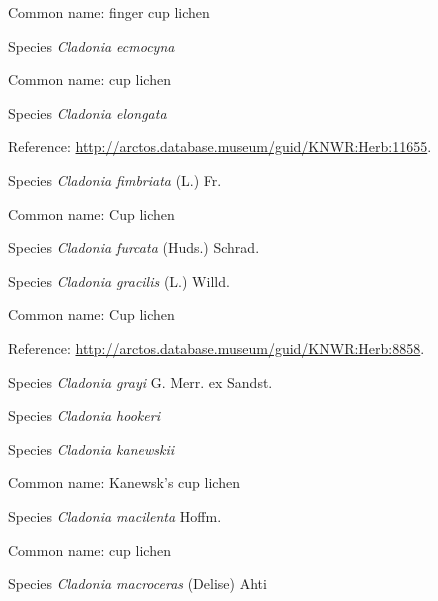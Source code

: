 \documentclass[9pt, article]{memoir}
\begin{document}
\begin{multicols}{2}
Common name: finger cup lichen

\vspace{6pt}\noindent\hspace{36pt}Species \textit{Cladonia ecmocyna}


Common name: cup lichen

\vspace{6pt}\noindent\hspace{36pt}Species \textit{Cladonia elongata}


Reference: 
\url{http://arctos.database.museum/guid/KNWR:Herb:11655}.

\vspace{6pt}\noindent\hspace{36pt}Species \textit{Cladonia fimbriata} (L.) Fr.


Common name: Cup lichen

\vspace{6pt}\noindent\hspace{36pt}Species \textit{Cladonia furcata} (Huds.) Schrad.


\vspace{6pt}\noindent\hspace{36pt}Species \textit{Cladonia gracilis} (L.) Willd.


Common name: Cup lichen

Reference: 
\url{http://arctos.database.museum/guid/KNWR:Herb:8858}.

\vspace{6pt}\noindent\hspace{36pt}Species \textit{Cladonia grayi} G. Merr. ex Sandst.


\vspace{6pt}\noindent\hspace{36pt}Species \textit{Cladonia hookeri}


\vspace{6pt}\noindent\hspace{36pt}Species \textit{Cladonia kanewskii}


Common name: Kanewsk's cup lichen

\vspace{6pt}\noindent\hspace{36pt}Species \textit{Cladonia macilenta} Hoffm.


Common name: cup lichen

\vspace{6pt}\noindent\hspace{36pt}Species \textit{Cladonia macroceras} (Delise) Ahti



\end{multicols}
\end{document}
